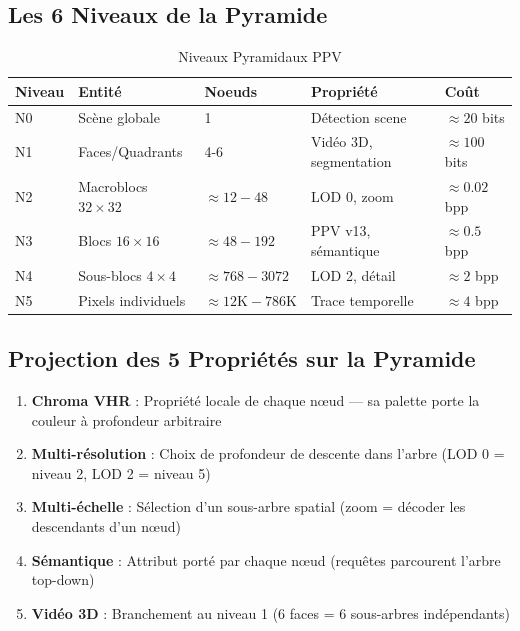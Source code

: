 \documentclass[12pt,a4paper]{article}
\begin{document}
	\subsection{Les 6 Niveaux de la Pyramide}
	
	\begin{table}[h]
		\centering
		\caption{Niveaux Pyramidaux PPV}
		\label{tab:pyramide}
		\begin{tabular}{@{}lllll@{}}
			\toprule
			\textbf{Niveau} & \textbf{Entité} & \textbf{Noeuds} & \textbf{Propriété} & \textbf{Coût} \\ \midrule
			N0 & Scène globale & 1 & Détection scene & $\approx 20$ bits \\
			N1 & Faces/Quadrants & 4-6 & Vidéo 3D, segmentation & $\approx 100$ bits \\
			N2 & Macroblocs $32 \times 32$ & $\approx 12-48$ & LOD 0, zoom & $\approx 0.02$ bpp \\
			N3 & Blocs $16 \times 16$ & $\approx 48-192$ & PPV v13, sémantique & $\approx 0.5$ bpp \\
			N4 & Sous-blocs $4 \times 4$ & $\approx 768-3072$ & LOD 2, détail & $\approx 2$ bpp \\
			N5 & Pixels individuels & $\approx 12\text{K}-786\text{K}$ & Trace temporelle & $\approx 4$ bpp \\
			\bottomrule
		\end{tabular}
	\end{table}
	
	\subsection{Projection des 5 Propriétés sur la Pyramide}
	
	\begin{enumerate}[label=\textbf{P\arabic*.}, leftmargin=*]
		\item \textbf{Chroma VHR} : Propriété locale de chaque nœud — sa palette porte la couleur à profondeur arbitraire
		\item \textbf{Multi-résolution} : Choix de profondeur de descente dans l'arbre (LOD 0 = niveau 2, LOD 2 = niveau 5)
		\item \textbf{Multi-échelle} : Sélection d'un sous-arbre spatial (zoom = décoder les descendants d'un nœud)
		\item \textbf{Sémantique} : Attribut porté par chaque nœud (requêtes parcourent l'arbre top-down)
		\item \textbf{Vidéo 3D} : Branchement au niveau 1 (6 faces = 6 sous-arbres indépendants)
	\end{enumerate}
	
\end{document}
